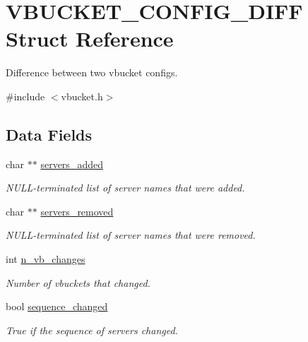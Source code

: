 \hypertarget{struct_v_b_u_c_k_e_t___c_o_n_f_i_g___d_i_f_f}{
\section{VBUCKET\_\-CONFIG\_\-DIFF Struct Reference}
\label{struct_v_b_u_c_k_e_t___c_o_n_f_i_g___d_i_f_f}
}


Difference between two vbucket configs.  




{\ttfamily \#include $<$vbucket.h$>$}

\subsection*{Data Fields}
\begin{DoxyCompactItemize}
\item 
char $\ast$$\ast$ \hyperlink{struct_v_b_u_c_k_e_t___c_o_n_f_i_g___d_i_f_f_a9dfbe7534e62b0938d11696f3ae8d970}{servers\_\-added}
\begin{DoxyCompactList}\small\item\em NULL-\/terminated list of server names that were added. \item\end{DoxyCompactList}\item 
char $\ast$$\ast$ \hyperlink{struct_v_b_u_c_k_e_t___c_o_n_f_i_g___d_i_f_f_a9a94896717369cad33a7d38b38652526}{servers\_\-removed}
\begin{DoxyCompactList}\small\item\em NULL-\/terminated list of server names that were removed. \item\end{DoxyCompactList}\item 
int \hyperlink{struct_v_b_u_c_k_e_t___c_o_n_f_i_g___d_i_f_f_a59f7ed3bc75f0b50128c0f397f3140a4}{n\_\-vb\_\-changes}
\begin{DoxyCompactList}\small\item\em Number of vbuckets that changed. \item\end{DoxyCompactList}\item 
bool \hyperlink{struct_v_b_u_c_k_e_t___c_o_n_f_i_g___d_i_f_f_a4b14e6d33d9c4d0c20e6b8dcea3e8cd6}{sequence\_\-changed}
\begin{DoxyCompactList}\small\item\em True if the sequence of servers changed. \item\end{DoxyCompactList}\end{DoxyCompactItemize}


